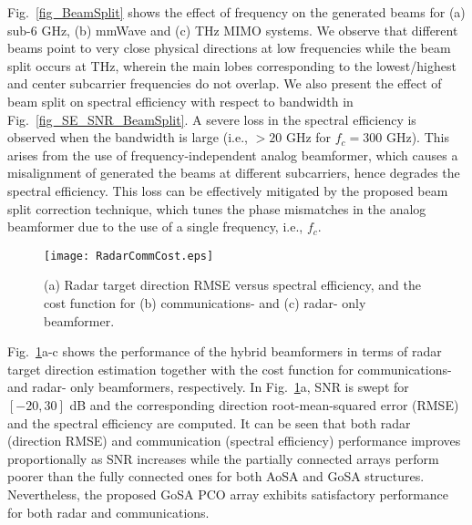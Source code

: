 \documentclass[journal,10pt]{IEEEtran}
\begin{document}
	
	
	
	{\color{black}Fig.~\ref{fig_BeamSplit} shows the effect of frequency on the generated beams for (a) sub-6 GHz, (b) mmWave and (c) THz MIMO systems. We observe that different beams point to very close physical directions at low frequencies while the beam split occurs at THz, wherein the main lobes corresponding to the lowest/highest and center subcarrier frequencies do not overlap.} We also present the effect of beam split on spectral efficiency with respect to bandwidth in Fig.~\ref{fig_SE_SNR_BeamSplit}. A severe loss in the spectral efficiency is observed when the bandwidth is large (i.e., $>20$ GHz for $f_c = 300$ GHz). This arises from the use of frequency-independent analog beamformer, which causes a misalignment of generated the beams at different subcarriers, hence degrades the spectral efficiency. This loss can be effectively mitigated by the proposed beam split correction technique, which tunes the phase mismatches in the analog beamformer due to the use of a single frequency, i.e., $f_c$.
	
	\begin{figure}[t]
		\centering
		{\texttt{[image: RadarCommCost.eps]} } 
		\caption{(a) Radar target direction RMSE versus spectral efficiency, and the cost function  for (b) communications- and (c) radar- only beamformer.}
		\label{fig_JRC}
	\end{figure}
	
	{\color{black}Fig.~\ref{fig_JRC}a-c shows the performance of the hybrid beamformers in terms of radar target direction estimation together with the cost function for communications- and radar- only beamformers, respectively. In Fig.~\ref{fig_JRC}a, SNR is swept for $[-20,30]$ dB and the corresponding direction root-mean-squared error (RMSE) and the spectral efficiency are computed.  It can be seen that both radar (direction RMSE) and communication (spectral efficiency) performance improves proportionally as SNR increases while the partially connected arrays perform poorer than the fully connected ones for both AoSA and GoSA structures. Nevertheless, the proposed GoSA PCO array exhibits satisfactory performance for both radar and communications. }
	
	
	
\end{document}
